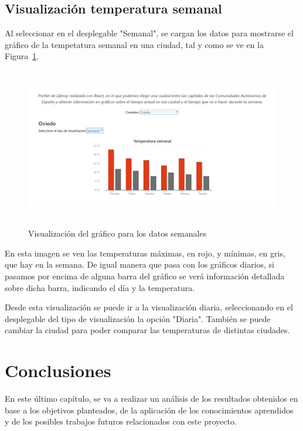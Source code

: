 \documentclass[a4paper, 12pt]{book}
\begin{document}
\section{Visualización temperatura semanal}
\label{sec:visualizacion-semanal}
Al seleccionar en el desplegable "Semanal", se cargan los datos para mostrarse el gráfico de la tempetatura semanal en una ciudad, tal y como se ve en la Figura~\ref{fig:pantalla_semanal}.
\begin{figure}[h]
  \centering
  \includegraphics[width=13cm, height=7cm]{img_usadas/pantalla_semanal.png}
  \caption{Visualización del gráfico para los datos semanales}
  \label{fig:pantalla_semanal}
\end{figure}

En esta imagen se ven las temperaturas máximas, en rojo, y mínimas, en gris, que hay en la semana. De igual manera que pasa con los gráficos diarios, si pasamos por encima de alguna barra del gráfico se verá información detallada sobre dicha barra, indicando el día y la temperatura.

\vspace{5mm}
Desde esta visualización se puede ir a la visualización diaria, seleccionando en el desplegable del tipo de visualización la opción "Diaria". También se puede cambiar la ciudad para poder comparar las temperaturas de distintas ciudades.





\cleardoublepage
\chapter{Conclusiones}
\label{chap:conclusiones}
En este último capítulo, se va a realizar un análisis de los resultados obtenidos en base a los objetivos planteados, de la aplicación de los conocimientos aprendidos y de los posibles trabajos futuros relacionados con este proyecto.
\end{document}
